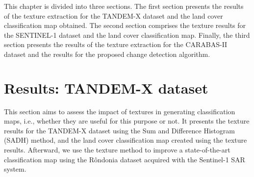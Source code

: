 This chapter is divided into three sections. The first section presents the results of the texture extraction for the TANDEM-X dataset and the land cover classification map obtained. The second section comprises the texture results for the SENTINEL-1 dataset and the land cover classification map. Finally, the third section presents the results of the texture extraction for the CARABAS-II dataset and the results for the proposed change detection algorithm. 

\section{Results: TANDEM-X dataset}
This section aims to assess the impact of textures in generating classification maps, i.e., whether they are useful for this purpose or not. It presents the texture results for the TANDEM-X dataset using the Sum and Difference Histogram (SADH) method, and the land cover classification map created using the texture results. Afterward, we use the texture method to improve a state-of-the-art classification map using the Rôndonia dataset acquired with the Sentinel-1 SAR system. 

